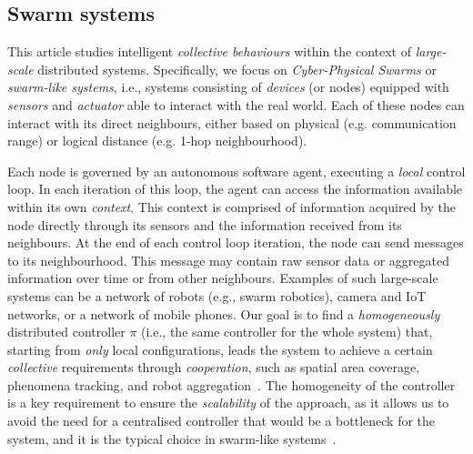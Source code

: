 \documentclass[conference]{IEEEtran}
\begin{document}
\subsection{Swarm systems}
This article studies intelligent \emph{collective behaviours} within the context of \emph{large-scale} distributed systems.
 Specifically, we focus on \emph{Cyber-Physical Swarms} or \emph{swarm-like systems}, 
 i.e.,  systems consisting of \emph{devices} (or nodes) equipped with \emph{sensors} and \emph{actuator} able to interact with the real world.
 Each of these nodes can interact with its direct neighbours, either based on physical (e.g. communication range) or logical distance (e.g. 1-hop neighbourhood).
 
%
Each node is governed by an autonomous software agent, 
 executing a \emph{local} control loop. 
 In each iteration of this loop, the agent can access the information available within its own \emph{context}. 
 This context is comprised of information acquired by the node directly through its sensors and the information received from its neighbours. 
%
At the end of each control loop iteration, 
 the node can send messages to its neighbourhood. 
 This message may contain raw sensor data or aggregated information over time or from other neighbours.
%
Examples of such large-scale systems can be a network of robots (e.g., swarm robotics), camera and IoT networks, or a network of mobile phones.
%
Our goal is to find a \emph{homogeneously} distributed controller $\pi$ (i.e., the same controller for the whole system) that, 
 starting from \emph{only} local configurations, leads 
 the system to achieve a certain \emph{collective} requirements through \emph{cooperation}, 
 such as spatial area coverage, phenomena tracking, and robot aggregation~\cite{DBLP:journals/firai/SchranzUSE20}.
%
The homogeneity of the controller is a key requirement to ensure the \emph{scalability} of the approach, 
 as it allows us to avoid the need for a centralised controller that would be a bottleneck for the system,
 and it is the typical choice in swarm-like systems~\cite{brambilla2013swarm,yang2021many,pmlr-v80-yang18d,DBLP:conf/aaai/ZhengYCZZWY18}.
%
\end{document}

